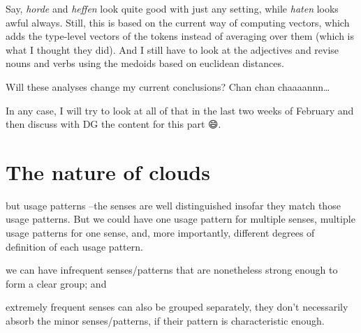 \documentclass[
]{book}
\providecommand{\tightlist}{%
  \setlength{\itemsep}{0pt}\setlength{\parskip}{0pt}}
\begin{document}
Say, \emph{horde} and \emph{heffen} look quite good with just any setting, while \emph{haten} looks awful always.
Still, this is based on the current way of computing vectors,
which adds the type-level vectors of the tokens instead of averaging over them
(which is what I thought they did).
And I still have to look at the adjectives and revise nouns and verbs using the medoids based on
euclidean distances.

Will these analyses change my current conclusions? Chan chan chaaaannn\ldots{}

In any case, I will try to look at all of that in the last two weeks of February and then
discuss with DG the content for this part 😄.

\hypertarget{the-nature-of-clouds}{%
\chapter{The nature of clouds}\label{the-nature-of-clouds}}

\begin{description}
\tightlist
\item[Clouds don't necessarily show senses]
but usage patterns --the senses are well distinguished
insofar they match those usage patterns. But we could have one usage pattern for multiple
senses, multiple usage patterns for one sense, and, more importantly, different degrees
of definition of each usage pattern.
\item[It is not a matter of frequency]
we can have infrequent senses/patterns that are nonetheless strong enough to form
a clear group; and

extremely frequent senses can also be grouped separately, they don't necessarily
absorb the minor senses/patterns, if their pattern is characteristic enough.
\end{description}

\printbibliography
\end{document}
